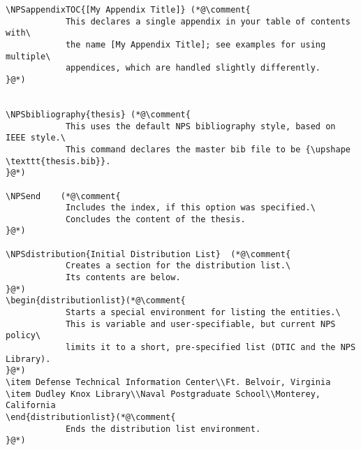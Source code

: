\begin{lstlisting}
\NPSappendixTOC{[My Appendix Title]} (*@\comment{
			This declares a single appendix in your table of contents with\
			the name [My Appendix Title]; see examples for using multiple\
			appendices, which are handled slightly differently.
}@*)


\NPSbibliography{thesis} (*@\comment{
			This uses the default NPS bibliography style, based on IEEE style.\
			This command declares the master bib file to be {\upshape \texttt{thesis.bib}}.
}@*)

\NPSend    (*@\comment{
			Includes the index, if this option was specified.\
			Concludes the content of the thesis.
}@*)

\NPSdistribution{Initial Distribution List}  (*@\comment{
			Creates a section for the distribution list.\
			Its contents are below.
}@*)
\begin{distributionlist}(*@\comment{
			Starts a special environment for listing the entities.\
			This is variable and user-specifiable, but current NPS policy\
			limits it to a short, pre-specified list (DTIC and the NPS Library).
}@*)
\item Defense Technical Information Center\\Ft. Belvoir, Virginia
\item Dudley Knox Library\\Naval Postgraduate School\\Monterey, California
\end{distributionlist}(*@\comment{
			Ends the distribution list environment.
}@*)


\end{lstlisting}
